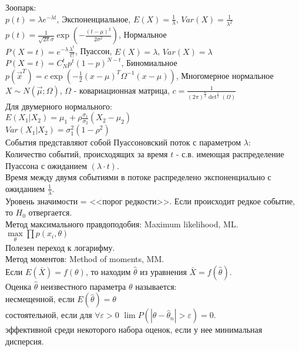 Зоопарк:  \\
$p(t)=\lambda e^{-\lambda t}$, Экспоненциальное, $E(X)=\frac{1}{\lambda } $,  $Var(X)=\frac{1}{\lambda ^{2} } $ \\
$p(t)=\frac{1}{\sqrt{2\pi } \sigma } \exp (-\frac{(t-\mu )^{2}
}{2\sigma ^{2} } )$,
Нормальное \\
 $P(X=t)=e^{-\lambda } \frac{\lambda ^{t}
}{t!} $, Пуассон, $E(X)=\lambda $,  $Var(X)=\lambda $ \\
$P(X=t)=C_{N}^{t} p^{t} (1-p)^{N-t} $,
Биномиальное \\
$p(\vec{x}^{T} )=c \exp (-\frac{1}{2} (x-\mu )^{T} \Omega
^{-1} (x-\mu ))$, Многомерное нормальное \\

$X\sim N(\vec{\mu };\Omega )$,  $\Omega $ - ковариационная
матрица, $c=\frac{1}{(2\pi )^{{\tfrac{n}{2}} } \det
^{{\tfrac{1}{2}} } (\Omega
)}$ \\
Для двумерного нормального: \\
$E(X_{1}|X_{2})=\mu_{1}+\rho\frac{\sigma_{1}}{\sigma_{2}}(X_{2}-\mu_{2})$ \\
$Var(X_{1}|X_{2})=\sigma_{1}^{2}(1-\rho^{2})$ \\


События представляют собой Пуассоновский поток с параметром
$\lambda $: \\
Количество событий, происходящих за время  $t$  - с.в. имеющая
распределение Пуассона с ожиданием  $(\lambda \cdot
t)$.\\
Время между двумя событиями в потоке распределено экспоненциально
с ожиданием  $\frac{1}{\lambda } $.\\

Уровень значимости = <<порог редкости>>. Если происходит редкое
событие, то  $H_{0} $  отвергается.\\

Метод максимального правдоподобия:  Maximum likelihood, ML. \\
$\mathop{\max }\limits_{\theta } \prod p(x_{i},\theta
) $ \\
Полезен переход к логарифму. \\


Метод моментов: Method of moments, MM. \\
Если $E(\bar{X})=f(\theta)$, то находим  $\hat{\theta }$  из
уравнения $\bar{X}=f(\hat{\theta})$. \\


Оценка $\hat{\theta}$ неизвестного параметра $\theta$ называется: \\
несмещенной, если  $E(\hat{\theta})=\theta$ \\
состоятельной, если для  $\forall \varepsilon
>0$   $\lim P(|\theta -\hat{\theta }_{n}|>\varepsilon )=0$. \\
эффективной среди некоторого набора оценок, если
у нее минимальная дисперсия. \\

